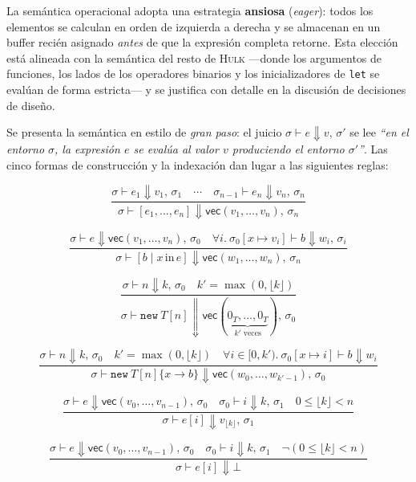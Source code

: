\documentclass[11pt,a4paper,oneside,openany]{report}
\newcommand{\hulk}{\textsc{Hulk}}
\newcommand{\code}[1]{\texttt{#1}}
\begin{document}
La semántica operacional adopta una estrategia \textbf{ansiosa}
(\textit{eager}): todos los elementos se calculan en orden de izquierda a
derecha y se almacenan en un buffer recién asignado \emph{antes} de que la
expresión completa retorne. Esta elección está alineada con la semántica
del resto de \hulk{} ---donde los argumentos de funciones, los lados de
los operadores binarios y los inicializadores de \code{let} se evalúan de
forma estricta--- y se justifica con detalle en la discusión de
decisiones de diseño.

Se presenta la semántica en estilo de \emph{gran paso}: el juicio
$\sigma \vdash e \Downarrow v,\,\sigma'$ se lee \emph{``en el entorno
$\sigma$, la expresión $e$ se evalúa al valor $v$ produciendo el entorno
$\sigma'$''}. Las cinco formas de construcción y la indexación dan lugar
a las siguientes reglas:

\begin{small}
\[
  \frac{
    \sigma \vdash e_1 \Downarrow v_1,\,\sigma_1
    \quad \cdots \quad
    \sigma_{n-1} \vdash e_n \Downarrow v_n,\,\sigma_n
  }{
    \sigma \vdash [e_1, \ldots, e_n] \Downarrow \mathsf{vec}(v_1, \ldots, v_n),\,\sigma_n
  }
  \tag{E-VecExp}
\]

\[
  \frac{
    \sigma \vdash e \Downarrow \mathsf{vec}(v_1, \ldots, v_n),\,\sigma_0
    \quad
    \forall i.\ \sigma_0[x \mapsto v_i] \vdash b \Downarrow w_i,\,\sigma_i
  }{
    \sigma \vdash [b \mid x \,\text{in}\, e] \Downarrow \mathsf{vec}(w_1, \ldots, w_n),\,\sigma_n
  }
  \tag{E-VecGen}
\]

\[
  \frac{
    \sigma \vdash n \Downarrow k,\,\sigma_0 \quad
    k' = \max(0, \lfloor k \rfloor)
  }{
    \sigma \vdash \texttt{new}\ T[n] \Downarrow
    \mathsf{vec}(\underbrace{0_T, \ldots, 0_T}_{k'\text{ veces}}),\,\sigma_0
  }
  \tag{E-VecAlloc}
\]

\[
  \frac{
    \sigma \vdash n \Downarrow k,\,\sigma_0 \quad
    k' = \max(0, \lfloor k \rfloor) \quad
    \forall i \in [0, k').\
      \sigma_0[x \mapsto i] \vdash b \Downarrow w_i
  }{
    \sigma \vdash \texttt{new}\ T[n]\{x \rightarrow b\} \Downarrow
    \mathsf{vec}(w_0, \ldots, w_{k'-1}),\,\sigma_0
  }
  \tag{E-VecAllocGen}
\]

\[
  \frac{
    \sigma \vdash e \Downarrow \mathsf{vec}(v_0, \ldots, v_{n-1}),\,\sigma_0 \quad
    \sigma_0 \vdash i \Downarrow k,\,\sigma_1 \quad
    0 \leq \lfloor k \rfloor < n
  }{
    \sigma \vdash e[i] \Downarrow v_{\lfloor k \rfloor},\,\sigma_1
  }
  \tag{E-IndexOk}
\]

\[
  \frac{
    \sigma \vdash e \Downarrow \mathsf{vec}(v_0, \ldots, v_{n-1}),\,\sigma_0 \quad
    \sigma_0 \vdash i \Downarrow k,\,\sigma_1 \quad
    \lnot(0 \leq \lfloor k \rfloor < n)
  }{
    \sigma \vdash e[i] \Downarrow \bot
  }
  \tag{E-IndexErr}
\]
\end{small}
\end{document}
